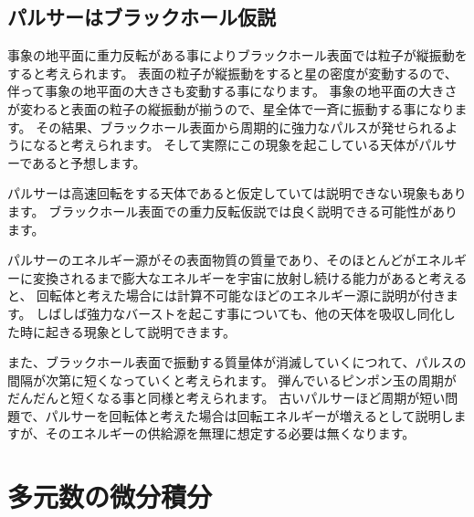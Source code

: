 \documentclass[a4paper,12pt,notitlepage]{jsreport}
\begin{document}
\section{パルサーはブラックホール仮説}

事象の地平面に重力反転がある事によりブラックホール表面では粒子が縦振動をすると考えられます。
表面の粒子が縦振動をすると星の密度が変動するので、伴って事象の地平面の大きさも変動する事になります。
事象の地平面の大きさが変わると表面の粒子の縦振動が揃うので、星全体で一斉に振動する事になります。
その結果、ブラックホール表面から周期的に強力なパルスが発せられるようになると考えられます。
そして実際にこの現象を起こしている天体がパルサーであると予想します。

パルサーは高速回転をする天体であると仮定していては説明できない現象もあります。
ブラックホール表面での重力反転仮説では良く説明できる可能性があります。

パルサーのエネルギー源がその表面物質の質量であり、そのほとんどがエネルギーに変換されるまで膨大なエネルギーを宇宙に放射し続ける能力があると考えると、
回転体と考えた場合には計算不可能なほどのエネルギー源に説明が付きます。
しばしば強力なバーストを起こす事についても、他の天体を吸収し同化した時に起きる現象として説明できます。

また、ブラックホール表面で振動する質量体が消滅していくにつれて、パルスの間隔が次第に短くなっていくと考えられます。
弾んでいるピンポン玉の周期がだんだんと短くなる事と同様と考えられます。
古いパルサーほど周期が短い問題で、パルサーを回転体と考えた場合は回転エネルギーが増えるとして説明しますが、そのエネルギーの供給源を無理に想定する必要は無くなります。

\chapter{多元数の微分積分}
\end{document}
